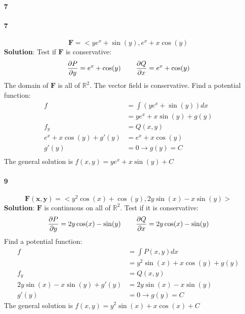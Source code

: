 \documentclass{article}
\newcommand{\parf}[2]{\frac{\partial #1}{\partial #2}}
\begin{document}
    \paragraph{7}

    \paragraph{7}
    \[\mathbf{F}=<ye^x + \sin(y), e^x + x\cos(y)\]
    \textbf{Solution}: Test if $\mathbf{F}$ is conservative:
    \[\parf{P}{y} = e^x + \cos(y) \hspace{0.3in} \parf{Q}{x} = e^x + \cos(y)\]
    The domain of $\mathbf{F}$ is all of $\mathbb{R}^2$.
    The vector field is conservative. Find a potential function:
    \begin{align*}
        f &= \int (ye^{x} + \sin(y))dx \\
        &= ye^{x} + x\sin(y) + g(y) \\
        f_y &= Q(x,y)\\
        e^{x} + x\cos(y) +g'(y) &= e^x + x\cos(y) \\
        g'(y) &= 0 \rightarrow g(y) = C \\
    \end{align*}
    The general solution is $f(x,y) = ye^{x} + x\sin(y) + C$

    \paragraph{9}
    \[\mathbf{F(x,y)}=<y^{2}\cos(x) + \cos(y), 2y\sin(x)-x\sin(y)>\]
    \textbf{Solution}: $\mathbf{F}$ is continuous on all of $\mathbb{R}^2$. Test if it is conservative:
    \[ \parf{P}{y} = 2y\cos(x)-\sin(y) \hspace{0.3in} \parf{Q}{x} = 2y\cos(x)-\sin(y)\]
    Find a potential function:
    \begin{align*}
        f &= \int P(x,y) dx \\
        &= y^{2}\sin(x) +x\cos(y) + g(y) \\
        f_y &= Q(x,y)\\
        2y\sin(x) -x\sin(y) + g'(y) &= 2y\sin(x) - x\sin(y) \\
        g'(y) &= 0 \rightarrow g(y) = C
    \end{align*}
    The general solution is $f(x,y) = y^{2}\sin(x) + x\cos(x) + C$
\end{document}
